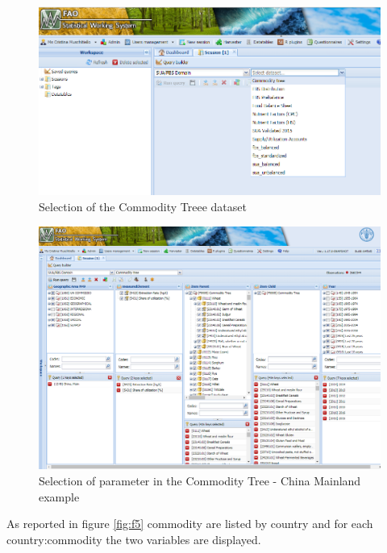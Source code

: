 \documentclass[]{article}
\begin{document}
\begin{figure}[H]

{\centering \includegraphics[width=0.9\linewidth]{images/commodityTree/03_selectDataset} 

}

\caption{\label{fig:f3}Selection of the Commodity Treee dataset}\label{fig:f3}
\end{figure}

\begin{figure}[H]

{\centering \includegraphics[width=0.9\linewidth]{images/commodityTree/04_selection} 

}

\caption{\label{fig:f4}Selection of parameter in the Commodity Tree - China Mainland example}\label{fig:f4}
\end{figure}

As reported in figure \ref{fig:f5} commodity are listed by country and
for each country:commodity the two variables are displayed.
\end{document}

